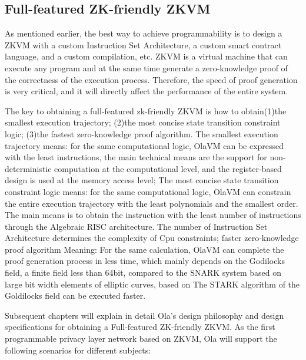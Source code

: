 \subsection{Full-featured ZK-friendly ZKVM}

As mentioned earlier, the best way to achieve programmability is to design a ZKVM with a custom Instruction Set Architecture, a custom smart contract language, and a custom compilation, etc. 
ZKVM is a virtual machine that can execute any program and at the same time generate a zero-knowledge proof of the correctness of the execution process. Therefore, the speed of proof generation 
is very critical, and it will directly affect the performance of the entire system.

The key to obtaining a full-featured zk-friendly ZKVM is how to obtain(1)the smallest execution trajectory; (2)the most concise state transition constraint logic; (3)the fastest 
zero-knowledge proof algorithm. The smallest execution trajectory means: for the same computational logic, OlaVM \cite{website:OlaVM} can be expressed with the least instructions, the main technical means are the 
support for non-deterministic computation at the computational level, and the register-based design is used at the memory access level; The most concise state transition constraint logic means: 
for the same computational logic, OlaVM \cite{website:OlaVM} can constrain the entire execution trajectory with the least polynomials and the smallest order. The main means is to obtain the instruction with the least 
number of instructions through the Algebraic RISC architecture. The number of Instruction Set Architecture determines the complexity of Cpu constraints; faster zero-knowledge proof algorithm 
Meaning: For the same calculation, OlaVM \cite{website:OlaVM} can complete the proof generation process in less time, which mainly depends on the Godilocks \cite{website:Goldilocks} field, a finite field less than 64bit, compared to the 
SNARK system based on large bit width elements of elliptic curves, based on The STARK algorithm of the Goldilocks \cite{website:Goldilocks} field can be executed faster.

Subsequent chapters will explain in detail Ola's design philosophy and design specifications for obtaining a Full-featured ZK-friendly ZKVM. As the first programmable privacy layer network 
based on ZKVM, Ola will support the following scenarios for different subjects:

